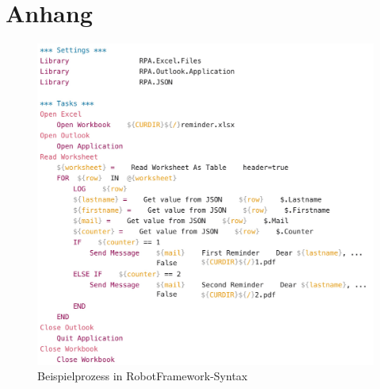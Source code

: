 \appendix
\section{Anhang}

\begin{figure}[h!]
    \centering
    \includegraphics[width=1.0\textwidth]{Bachelorarbeit/images/exampleBot2_v4.png}
    \caption{Beispielprozess in RobotFramework-Syntax}
    \label{fig:ScrRobotFr}
\end{figure}


